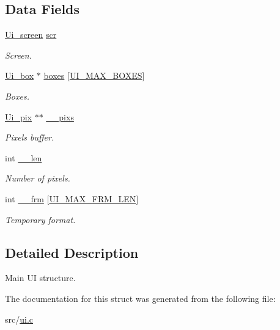 \subsection*{Data Fields}
\begin{DoxyCompactItemize}
\item 
\mbox{\label{struct__Ui_abd7c2a78bbdbe0e91a47a1461660b747}} 
\hyperlink{struct__Ui__screen}{Ui\+\_\+screen} \hyperlink{struct__Ui_abd7c2a78bbdbe0e91a47a1461660b747}{scr}
\begin{DoxyCompactList}\small\item\em Screen. \end{DoxyCompactList}\item 
\mbox{\label{struct__Ui_ab4d33275d1afe8817a640653ab4b6848}} 
\hyperlink{struct__Ui__box}{Ui\+\_\+box} $\ast$ \hyperlink{struct__Ui_ab4d33275d1afe8817a640653ab4b6848}{boxes} \mbox{[}\hyperlink{ui_8c_a1be73fb0e5253951bdb7f2a4bd6a1524}{U\+I\+\_\+\+M\+A\+X\+\_\+\+B\+O\+X\+ES}\mbox{]}
\begin{DoxyCompactList}\small\item\em Boxes. \end{DoxyCompactList}\item 
\mbox{\label{struct__Ui_a11af896bffe4bdbeca5ca871f7a9b7f0}} 
\hyperlink{struct__Ui__pix}{Ui\+\_\+pix} $\ast$$\ast$ \hyperlink{struct__Ui_a11af896bffe4bdbeca5ca871f7a9b7f0}{\+\_\+\+\_\+pixs}
\begin{DoxyCompactList}\small\item\em Pixels buffer. \end{DoxyCompactList}\item 
\mbox{\label{struct__Ui_a368b423615ed2b6852c1ca99fd6351ce}} 
int \hyperlink{struct__Ui_a368b423615ed2b6852c1ca99fd6351ce}{\+\_\+\+\_\+len}
\begin{DoxyCompactList}\small\item\em Number of pixels. \end{DoxyCompactList}\item 
\mbox{\label{struct__Ui_a2e557f044026b3a80e8a4a60d43a31cd}} 
int \hyperlink{struct__Ui_a2e557f044026b3a80e8a4a60d43a31cd}{\+\_\+\+\_\+frm} \mbox{[}\hyperlink{ui_8c_aab208380ff579bef5fd8b91fa0c0215a}{U\+I\+\_\+\+M\+A\+X\+\_\+\+F\+R\+M\+\_\+\+L\+EN}\mbox{]}
\begin{DoxyCompactList}\small\item\em Temporary format. \end{DoxyCompactList}\end{DoxyCompactItemize}


\subsection{Detailed Description}
Main UI structure. 

The documentation for this struct was generated from the following file\+:\begin{DoxyCompactItemize}
\item 
src/\hyperlink{ui_8c}{ui.\+c}\end{DoxyCompactItemize}
